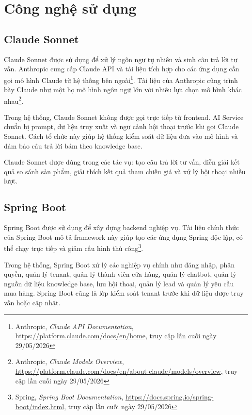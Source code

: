 \documentclass[../DoAn.tex]{subfiles}
\begin{document}
\section{Công nghệ sử dụng}
\label{section:3.2}

\subsection{Claude Sonnet}
\label{subsection:3.2.1}

Claude Sonnet được sử dụng để xử lý ngôn ngữ tự nhiên và sinh câu trả lời tư vấn. Anthropic cung cấp Claude API và tài liệu tích hợp cho các ứng dụng cần gọi mô hình Claude từ hệ thống bên ngoài\footnote{Anthropic, \textit{Claude API Documentation}, \url{https://platform.claude.com/docs/en/home}, truy cập lần cuối ngày 29/05/2026}. Tài liệu của Anthropic cũng trình bày Claude như một họ mô hình ngôn ngữ lớn với nhiều lựa chọn mô hình khác nhau\footnote{Anthropic, \textit{Claude Models Overview}, \url{https://platform.claude.com/docs/en/about-claude/models/overview}, truy cập lần cuối ngày 29/05/2026}.

Trong hệ thống, Claude Sonnet không được gọi trực tiếp từ frontend. AI Service chuẩn bị prompt, dữ liệu truy xuất và ngữ cảnh hội thoại trước khi gọi Claude Sonnet. Cách tổ chức này giúp hệ thống kiểm soát dữ liệu đưa vào mô hình và đảm bảo câu trả lời bám theo knowledge base.

Claude Sonnet được dùng trong các tác vụ: tạo câu trả lời tư vấn, diễn giải kết quả so sánh sản phẩm, giải thích kết quả tham chiếu giá và xử lý hội thoại nhiều lượt.

\subsection{Spring Boot}
\label{subsection:3.2.2}

Spring Boot được sử dụng để xây dựng backend nghiệp vụ. Tài liệu chính thức của Spring Boot mô tả framework này giúp tạo các ứng dụng Spring độc lập, có thể chạy trực tiếp và giảm cấu hình thủ công\footnote{Spring, \textit{Spring Boot Documentation}, \url{https://docs.spring.io/spring-boot/index.html}, truy cập lần cuối ngày 29/05/2026}.

Trong hệ thống, Spring Boot xử lý các nghiệp vụ chính như đăng nhập, phân quyền, quản lý tenant, quản lý thành viên cửa hàng, quản lý chatbot, quản lý nguồn dữ liệu knowledge base, lưu hội thoại, quản lý lead và quản lý yêu cầu mua hàng. Spring Boot cũng là lớp kiểm soát tenant trước khi dữ liệu được truy vấn hoặc cập nhật.
\end{document}
